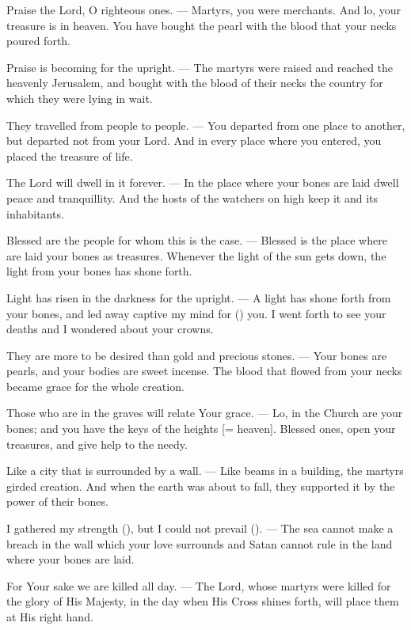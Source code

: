 \documentclass[12pt,twoside,a5paper]{article}
\begin{document}
\begin{halfparskip}
  Praise the Lord, O righteous ones. --- Martyrs, you were merchants. And lo, your treasure is in heaven. You have bought the pearl with the blood that your necks poured forth.

  Praise is becoming for the upright. --- The martyrs were raised and reached the heavenly Jerusalem, and bought with the blood of their necks the country for which they were lying in wait.

  They travelled from people to people. --- You departed from one place to another, but departed not from your Lord. And in every place where you entered, you placed the treasure of life.

  The Lord will dwell in it forever. --- In the place where your bones are laid dwell peace and tranquillity. And the hosts of the watchers on high keep it and its inhabitants.

  Blessed are the people for whom this is the case. --- Blessed is the place where are laid your bones as treasures. Whenever the light of the sun gets down, the light from your bones has shone forth.

  Light has risen in the darkness for the upright. --- A light has shone forth from your bones, and led away captive my mind for () you. I went forth to see your deaths and I wondered about your crowns.

  They are more to be desired than gold and precious stones. --- Your bones are pearls, and your bodies are sweet incense. The blood that flowed from your necks became grace for the whole creation.

  Those who are in the graves will relate Your grace. --- Lo, in the Church are your bones; and you have the keys of the heights [= heaven]. Blessed ones, open your treasures, and give help to the needy.

  Like a city that is surrounded by a wall. --- Like beams in a building, the martyrs girded creation. And when the earth was about to fall, they supported it by the power of their bones.

  I gathered my strength (), but I could not prevail (). --- The sea cannot make a breach in the wall which your love surrounds and Satan cannot rule in the land where your bones are laid.

  For Your sake we are killed all day. --- The Lord, whose martyrs were killed for the glory of His Majesty, in the day when His Cross shines forth, will place them at His right hand.


\end{halfparskip}
\end{document}

